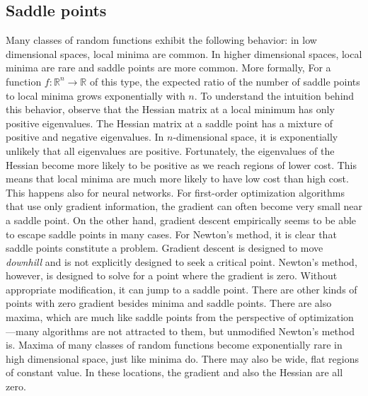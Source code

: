 \subsection{Saddle points}
Many classes of random functions exhibit the following behavior: in low dimensional spaces, local minima are common. In higher dimensional spaces, local minima are rare and saddle points are more common. More formally, For a function $f : \mathbb{R}^n \rightarrow \mathbb{R}$ of this type, the expected ratio of the number of saddle points to local minima grows exponentially with $n$. To understand the intuition behind this behavior, observe that the Hessian matrix at a local minimum has only positive eigenvalues. The Hessian matrix at a saddle point has a mixture of positive and negative eigenvalues. In $n$-dimensional space, it is exponentially unlikely that all eigenvalues are positive.\newline\newline
Fortunately, the eigenvalues of the Hessian become more likely to be positive as we reach regions of lower cost. This means that local
minima are much more likely to have low cost than high cost. This happens also for neural networks.\newline\newline
For first-order optimization algorithms that use only gradient information, the gradient can often become very small near a saddle
point. On the other hand, gradient descent empirically seems to be able to escape saddle points in many cases.\newline\newline
For Newton’s method, it is clear that saddle points constitute a problem. Gradient descent is designed to move \textit{downhill} and is not explicitly designed to seek a critical point. Newton’s method, however, is designed to solve for a point where the gradient is zero. Without appropriate modification, it can jump to a saddle point.\newline\newline
There are other kinds of points with zero gradient besides minima and saddle points. There are also maxima, which are much like saddle points from the perspective of optimization—many algorithms are not attracted to them, but unmodified Newton’s method is. Maxima of many classes of random functions become exponentially rare in high dimensional space, just like minima do.\newline\newline
There may also be wide, flat regions of constant value. In these locations, the gradient and also the Hessian are all zero.

